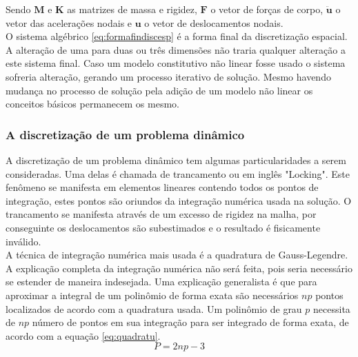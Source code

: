Sendo $ \boldsymbol{M} $ e $ \boldsymbol{K} $ as matrizes de massa e rigidez, $\boldsymbol{F}$ o vetor de forças de corpo, $ \boldsymbol{\ddot{u}} $ o vetor das acelerações nodais e $\boldsymbol{u}$ o vetor de deslocamentos nodais.\\

O sistema algébrico \ref{eq:formafindiscesp} é a forma final da discretização espacial. A alteração de uma para duas ou três dimensões não traria qualquer alteração a este sistema final. Caso um modelo constitutivo não linear fosse usado o sistema sofreria alteração, gerando um processo iterativo de solução. Mesmo havendo mudança no processo de solução pela adição de um modelo não linear os conceitos básicos permanecem os mesmo.

\subsubsection{A discretização de um problema dinâmico}

A discretização de um problema dinâmico tem algumas particularidades a serem consideradas. Uma delas é chamada de trancamento ou em inglês "Locking". Este fenômeno se manifesta em elementos lineares contendo todos os pontos de integração, estes pontos são oriundos da integração numérica usada na solução. O trancamento se manifesta através de um excesso de rigidez na malha, por conseguinte os deslocamentos são subestimados e o resultado é fisicamente inválido. \\

A técnica de integração numérica mais usada é a quadratura de Gauss-Legendre. A explicação completa da integração numérica não será feita, pois seria necessário se estender de maneira indesejada. Uma explicação generalista é que para aproximar a integral de um polinômio de forma exata são necessários $ np $ pontos localizados de acordo com a quadratura usada. Um polinômio de grau $p$ necessita de $np$ número de pontos em sua integração para ser integrado de forma exata, de acordo com a equação \ref{eq:quadratu}. 
\begin{equation} \label{eq:quadratu}
    P=2np-3
\end{equation}


